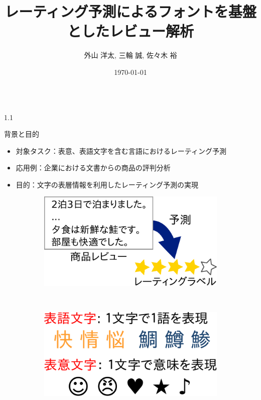 \documentclass[unicode,10pt]{beamer}
\title{レーティング予測によるフォントを基盤としたレビュー解析}
\institute{豊田工業大学 知能数理研究室}
\author{外山 洋太, 三輪 誠, 佐々木 裕}
\date{\today}
\newlength{\mycolumnwidth}
\begin{document}
\begin{frame}[t]
\vspace{-1em} %

\begin{columns}[onlytextwidth,t]
  \begin{column}{1.1\mycolumnwidth}
    \begin{block}{背景と目的}
      \begin{itemize}
        \item 対象タスク：表意、表語文字を含む言語におけるレーティング予測
        \item 応用例：企業における文書からの商品の評判分析
        \item 目的：文字の表層情報を利用したレーティング予測の実現
      \end{itemize}
    \end{block}
    \begin{figure}
      \begin{subfigure}{0.5\linewidth}
        \includegraphics[width=\linewidth]{fig/review.pdf}
      \end{subfigure}%
      ~
      \begin{subfigure}{0.45\linewidth}
        \includegraphics[width=\linewidth]{fig/logogram_and_ideogram.pdf}
      \end{subfigure}

\end{figure}
\end{column}
\end{columns}
\end{frame}
\end{document}
